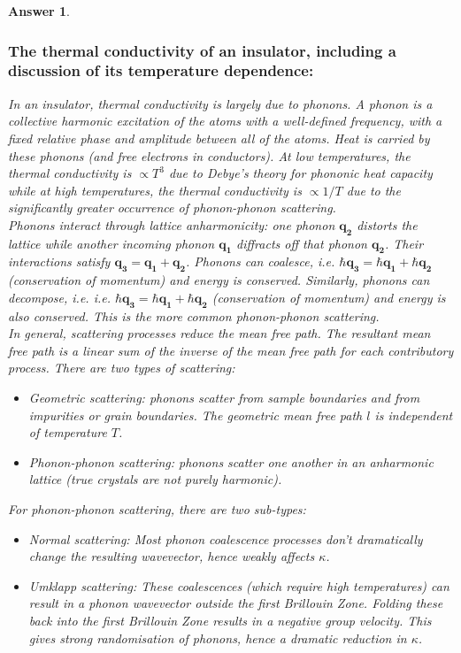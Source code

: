 \documentclass[a4paper]{article}
\newtheorem{ans}{Answer}[subsection]
\theoremstyle{new}
\begin{document}
\begin{ans}
\newpage
\subsubsection*{The thermal conductivity of an insulator, including a discussion of its temperature dependence:}
In an insulator, thermal conductivity is largely due to phonons. A phonon is a collective harmonic excitation of the atoms with a well-defined frequency, with a fixed relative phase and amplitude between all of the atoms. Heat is carried by these phonons (and free electrons in conductors). At low temperatures, the thermal conductivity is $\propto T^3$ due to Debye's theory for phononic heat capacity while at high temperatures, the thermal conductivity is $\propto 1/T$ due to the significantly greater occurrence of phonon-phonon scattering.\\[5pt]
Phonons interact through lattice anharmonicity: one phonon $\mathbf{q_2}$ distorts the lattice while another incoming phonon $\mathbf{q_1}$ diffracts off that phonon $\mathbf{q_2}$. Their interactions satisfy $\mathbf{q_3}=\mathbf{q_1}+\mathbf{q_2}$. Phonons can coalesce, i.e. $\hbar\mathbf{q_3}=\hbar\mathbf{q_1}+\hbar\mathbf{q_2}$ (conservation of momentum) and energy is conserved. Similarly, phonons can decompose, i.e. i.e. $\hbar\mathbf{q_3}=\hbar\mathbf{q_1}+\hbar\mathbf{q_2}$ (conservation of momentum) and energy is also conserved. This is the more common phonon-phonon scattering.\\[5pt]
In general, scattering processes reduce the mean free path. The resultant mean free path is a linear sum of the inverse of the mean free path for each contributory process. There are two types of scattering:
\begin{itemize}
    \item Geometric scattering: phonons scatter from sample boundaries and from impurities or grain boundaries. The geometric mean free path $l$ is independent of temperature $T$.
    \item Phonon-phonon scattering: phonons scatter one another in an anharmonic lattice (true crystals are not purely harmonic). 
\end{itemize}
For phonon-phonon scattering, there are two sub-types:
\begin{itemize}
\item Normal scattering: Most phonon coalescence processes don't dramatically change the resulting wavevector, hence weakly affects $\kappa$.
\item Umklapp scattering: These coalescences (which require high temperatures) can result in a phonon wavevector outside the first Brillouin Zone. Folding these back into the first Brillouin Zone results in a negative group velocity. This gives strong randomisation of phonons, hence a dramatic reduction in $\kappa$.

\end{itemize}
\end{ans}
\end{document}

